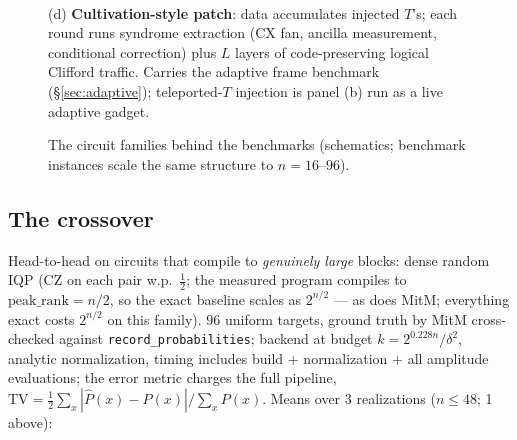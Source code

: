 \documentclass[11pt]{article}
\begin{document}
\begin{figure}[t]
\begin{minipage}[t]{0.48\linewidth}
\\[3pt]
{\scriptsize (d) \textbf{Cultivation-style patch}: data accumulates injected
$T$'s; each round runs syndrome extraction (CX fan, ancilla measurement,
conditional correction) plus $L$ layers of code-preserving logical Clifford
traffic. Carries the adaptive frame benchmark (\S\ref{sec:adaptive});
teleported-$T$ injection is panel (b) run as a live adaptive gadget.}
\end{minipage}
\caption{The circuit families behind the benchmarks (schematics; benchmark
instances scale the same structure to $n=16$--$96$).}
\label{fig:families}
\end{figure}

\subsection{The crossover}\label{sec:overlap}
Head-to-head on circuits that compile to \emph{genuinely large} blocks:
dense random IQP (CZ on each pair w.p.\ $\tfrac12$; the measured program
compiles to $\mathrm{peak\_rank}=n/2$, so the exact baseline scales as
$2^{n/2}$ --- as does MitM; everything exact costs $2^{n/2}$ on this
family). $96$ uniform targets, ground truth by MitM cross-checked against
\texttt{record\_probabilities}; backend at budget $k=2^{0.228n}/\delta^2$,
analytic normalization, timing includes build $+$ normalization $+$ all
amplitude evaluations; the error metric charges the full pipeline,
$\mathrm{TV}=\tfrac12\sum_x|\hat P(x)-P(x)|/\sum_x P(x)$. Means over 3
realizations ($n\le48$; 1 above):
\end{document}
